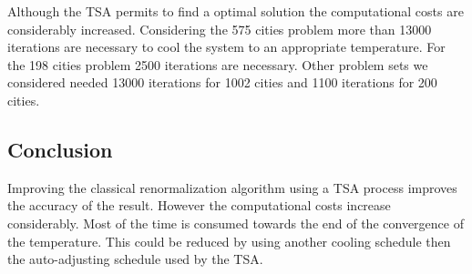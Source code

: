 Although the TSA permits to find a optimal solution the computational costs
are considerably increased. Considering the 575 cities problem more than 13000
iterations are necessary to cool the system to an appropriate temperature. For
the 198 cities problem 2500 iterations are necessary. Other problem sets
we considered needed 13000 iterations for 1002 cities and 1100 iterations for
200 cities.

\subsection{Conclusion}
Improving the classical renormalization algorithm using a TSA process improves
the accuracy of the result. However the computational costs increase considerably.
Most of the time is consumed towards the end of the convergence of the
temperature. This could be reduced by using another cooling schedule then the 
auto-adjusting schedule used by the TSA.





